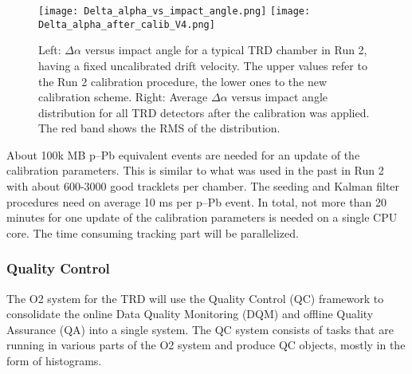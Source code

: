 \begin{figure}[htb]
  \centering
    \texttt{[image: Delta\_alpha\_vs\_impact\_angle.png]}
    \texttt{[image: Delta\_alpha\_after\_calib\_V4.png]}
  \caption{Left: $\Delta\alpha$ versus impact angle for a typical TRD chamber in Run 2, having a fixed uncalibrated drift velocity. The upper values refer to the Run 2 calibration procedure, the lower ones to the new calibration scheme. Right: Average $\Delta\alpha$ versus impact angle distribution for all TRD detectors after the calibration was applied. The red band shows the RMS of the distribution.}
  \label{fig:calibrate_5}
  \end{figure}

About 100k MB p--Pb equivalent events are needed for an update of the calibration parameters. This is similar to what was used in the past in Run 2 with about 600-3000 good tracklets per chamber. The seeding and Kalman filter procedures need on average 10 ms per p--Pb event. In total, not more than 20 minutes for one update of the calibration parameters is needed on a single CPU core. 
The time consuming tracking part will be parallelized.

\subsubsection{Quality Control}

The O2 system for the TRD will use the Quality Control (QC) framework to consolidate the online Data Quality Monitoring (DQM) and offline Quality Assurance (QA) into a single system. The QC system consists of tasks that are running in various parts of the O2 system and produce QC objects, mostly in the form of histograms.

